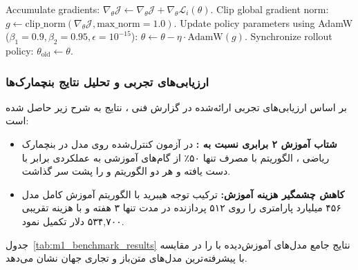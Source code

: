 \begin{latin}
\begin{algorithm}[H]
\begin{algorithmic}[1]
            \State Accumulate gradients: $\nabla_\theta \mathcal{J} \leftarrow \nabla_\theta \mathcal{J} + \nabla_\theta \mathcal{L}_i(\theta)$.
        \EndFor
        \State Clip global gradient norm: $g \leftarrow \text{clip\_norm}(\nabla_\theta \mathcal{J}, \text{max\_norm}=1.0)$.
        \State Update policy parameters using AdamW ($\beta_1=0.9, \beta_2=0.95, \epsilon=10^{-15}$):
        \State \quad $\theta \leftarrow \theta - \eta \cdot \text{AdamW}(g)$.
    \EndFor
    \State Synchronize rollout policy: $\theta_{\text{old}} \leftarrow \theta$.
\EndFor
\end{algorithmic}
\end{algorithm}
\end{latin}

\subsubsection*{ارزیابی‌های تجربی و تحلیل نتایج بنچمارک‌ها}

بر اساس ارزیابی‌های تجربی ارائه‌شده در گزارش فنی  \cite{minimax2025m1}، نتایج به شرح زیر حاصل شده است:
\begin{itemize}
    \item \textbf{شتاب آموزش ۲ برابری نسبت به :} در آزمون کنترل‌شده روی مدل  در بنچمارک ریاضی ، الگوریتم  با مصرف تنها ۵۰٪ از گام‌های آموزشی به عملکردی برابر با  دست یافته و هر دو الگوریتم  و  را پشت سر گذاشت.
    \item \textbf{کاهش چشمگیر هزینه آموزش:} ترکیب توجه هیبرید با الگوریتم  آموزش کامل مدل ۴۵۶ میلیارد پارامتری را روی ۵۱۲ پردازنده  در مدت تنها ۳ هفته و با هزینه تقریبی ۵۳۴,۷۰۰ دلار تکمیل نمود.
\end{itemize}

جدول~\ref{tab:m1_benchmark_results} نتایج جامع مدل‌های آموزش‌دیده با  را در مقایسه با پیشرفته‌ترین مدل‌های متن‌باز و تجاری جهان نشان می‌دهد.


